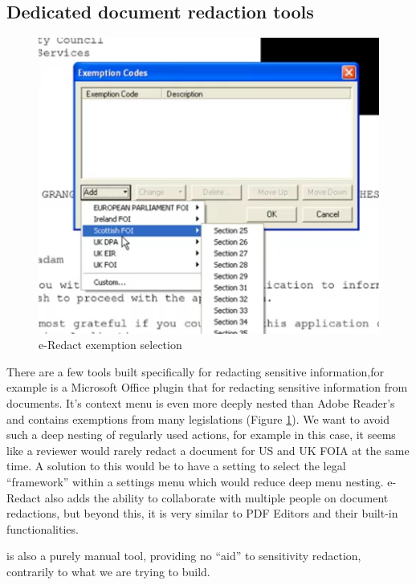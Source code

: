 \documentclass{l4proj}
\begin{document}
\subsection{Dedicated document redaction tools}

\begin{figure}
    \includegraphics[width=\linewidth]{images/related_products/eredact_dropdown.png}
    \caption{e-Redact exemption selection}
    \vspace{-17pt}
    \label{fig:eredact-dropdown}
\end{figure}

There are a few tools built specifically for redacting sensitive information,for example \textcite{ERedact} is a Microsoft Office plugin that for redacting sensitive information from documents.
It's context menu is even more deeply nested than Adobe Reader's and contains exemptions from many legislations (Figure \ref{fig:eredact-dropdown}).
We want to avoid such a deep nesting of regularly used actions, for example in this case, it seems like a reviewer would rarely redact a document for US and UK FOIA at the same time.
A solution to this would be to have a setting to select the legal ``framework'' within a settings menu which would reduce deep menu nesting.
e-Redact also adds the ability to collaborate with multiple people on document redactions, but beyond this, it is very similar to PDF Editors and their built-in functionalities.

\textcite{ERedact} is also a purely manual tool, providing no ``aid'' to sensitivity redaction, contrarily to what we are trying to build.
\end{document}

